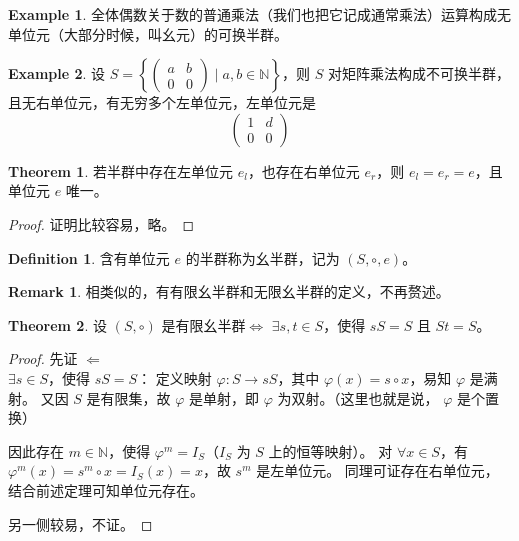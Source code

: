 \documentclass[oneside]{book}
\theoremstyle{definition}
\newtheorem{example}{Example}[section]
\newtheorem{definition}{Definition}[section]
\newtheorem{theorem}{Theorem}[section]
\newtheorem{remark}{Remark}[section]
\begin{document}
\begin{example}
	全体偶数关于数的普通乘法（我们也把它记成通常乘法）运算构成无单位元（大部分时候，叫幺元）的可换半群。
\end{example}

\begin{example}
	设 \( S = \left\{ \begin{pmatrix} a & b \\ 0 & 0 \end{pmatrix} \mid a, b \in \mathbb{N} \right\} \)，则 \( S \) 对矩阵乘法构成不可换半群，且无右单位元，有无穷多个左单位元，左单位元是
	\[\begin{pmatrix} 1 & d \\ 0 & 0 \end{pmatrix}\]
\end{example}

\begin{theorem}
	若半群中存在左单位元 \( e_l \)，也存在右单位元 \( e_r \)，则 \( e_l = e_r = e \)，且单位元 \( e \) 唯一。
\end{theorem}
\begin{proof}
	证明比较容易，略。
\end{proof}
\begin{definition}
	含有单位元 \( e \) 的半群称为幺半群，记为 \( (S, \circ, e) \)。
\end{definition}
\begin{remark}
	相类似的，有有限幺半群和无限幺半群的定义，不再赘述。
\end{remark}
\begin{theorem}
	设 \( (S, \circ) \) 是有限幺半群\(\iff\) \( \exists s, t \in S \)，使得 \( sS = S \) 且 \( St = S \)。
\end{theorem}

\begin{proof}
	先证 \(\Leftarrow\)\\ \( \exists s \in S \)，使得 \( sS = S \)：
	定义映射 \( \varphi: S \to sS \)，其中 \( \varphi(x) = s \circ x \)，易知 \( \varphi \) 是满射。
	又因 \( S \) 是有限集，故 \( \varphi \) 是单射，即 \( \varphi \) 为双射。（这里也就是说， \(\varphi\) 是个置换）
	
	
	因此存在 \( m \in \mathbb{N} \)，使得 \( \varphi^m = I_S \)（\( I_S \) 为 \( S \) 上的恒等映射）。
	对 \( \forall x \in S \)，有 \( \varphi^m(x) = s^m \circ x = I_S(x) = x \)，故 \( s^m \) 是左单位元。
	同理可证存在右单位元，结合前述定理可知单位元存在。
	
	另一侧较易，不证。
\end{proof}
\end{document}
